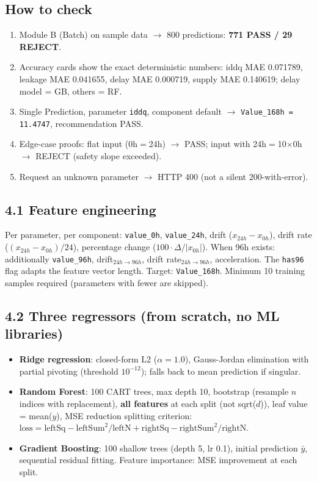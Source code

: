 \documentclass[11pt,a4paper]{article}
\newcommand{\code}[1]{\texttt{\small #1}}
\begin{document}
\subsection*{How to check}
\begin{enumerate}[leftmargin=1.5em]
  \item Module B (Batch) on sample data $\rightarrow$ 800 predictions: \textbf{771 PASS /
        29 REJECT}.
  \item Accuracy cards show the exact deterministic numbers: iddq MAE 0.071789, leakage MAE
        0.041655, delay MAE 0.000719, supply MAE 0.140619; delay model = GB, others = RF.
  \item Single Prediction, parameter \code{iddq}, component default $\rightarrow$
        \code{Value\_168h = 11.4747}, recommendation PASS.
  \item Edge-case proofs: flat input (0h$=$24h) $\rightarrow$ PASS; input with 24h$=$10$\times$0h
        $\rightarrow$ REJECT (safety slope exceeded).
  \item Request an unknown parameter $\rightarrow$ HTTP 400 (not a silent 200-with-error).
\end{enumerate}

\subsection*{4.1 Feature engineering}
Per parameter, per component: \code{value\_0h}, \code{value\_24h}, drift
($x_{24h}-x_{0h}$), drift rate ($(x_{24h}-x_{0h})/24$), percentage change
($100\cdot\Delta/|x_{0h}|$). When 96h exists: additionally \code{value\_96h}, drift$_{24h\rightarrow96h}$,
drift rate$_{24h\rightarrow96h}$, acceleration. The \code{has96} flag adapts the feature vector
length. Target: \code{Value\_168h}. Minimum 10 training samples required (parameters with fewer
are skipped).

\subsection*{4.2 Three regressors (from scratch, no ML libraries)}
\begin{itemize}[leftmargin=1.5em]
  \item \textbf{Ridge regression}: closed-form L2 ($\alpha=1.0$), Gauss-Jordan elimination with
        partial pivoting (threshold $10^{-12}$); falls back to mean prediction if singular.
  \item \textbf{Random Forest}: 100 CART trees, max depth 10, bootstrap (resample $n$ indices with
        replacement), \textbf{all features} at each split (not sqrt($d$)), leaf value = mean($y$),
        MSE reduction splitting criterion: $\text{loss} = \text{leftSq} - \text{leftSum}^2/\text{leftN}
        + \text{rightSq} - \text{rightSum}^2/\text{rightN}$.
  \item \textbf{Gradient Boosting}: 100 shallow trees (depth 5, lr 0.1), initial prediction
        $\bar{y}$, sequential residual fitting. Feature importance: MSE improvement at each split.
\end{itemize}
\end{document}

